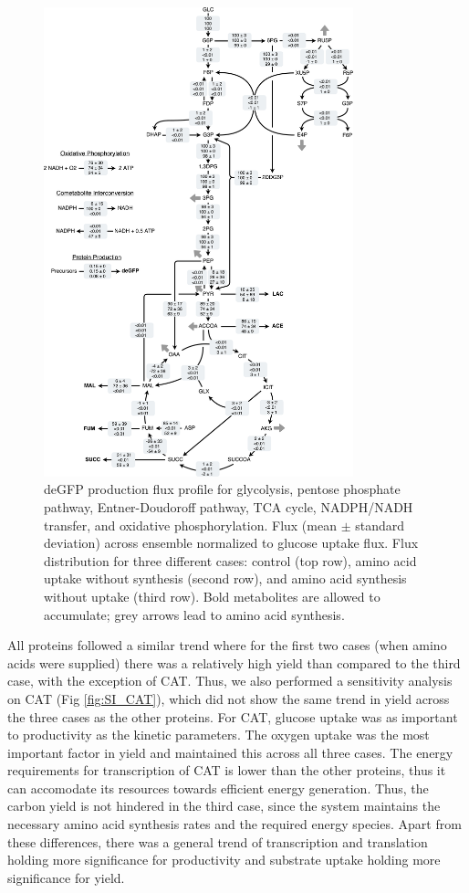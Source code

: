 \documentclass[journal=asbcd6,manuscript=article]{achemso}
\begin{document}
\begin{figure}[h!]
\includegraphics[width=0.8\textwidth]{./Figures/flux.pdf}
\caption{deGFP production flux profile for glycolysis, pentose phosphate pathway, Entner-Doudoroff pathway, TCA cycle, NADPH/NADH transfer, and oxidative phosphorylation. Flux (mean $\pm$ standard deviation) across ensemble normalized to glucose uptake flux. Flux distribution for three different cases: control (top row), amino acid uptake without synthesis (second row), and amino acid synthesis without uptake (third row). Bold metabolites are allowed to accumulate; grey arrows lead to amino acid synthesis.}
\label{fig:flux}
\end{figure}

All proteins followed a similar trend where for the first two cases (when amino acids were supplied) there was a relatively high yield than compared to the third case, with the exception of CAT. 
Thus, we also performed a sensitivity analysis on CAT (Fig \ref{fig:SI_CAT}), which did not show the same trend in yield across the three cases as the other proteins.
For CAT, glucose uptake was as important to productivity as the kinetic parameters.
The oxygen uptake was the most important factor in yield and maintained this across all three cases.
The energy requirements for transcription of CAT is lower than the other proteins, thus it can accomodate its resources towards efficient energy generation.
Thus, the carbon yield is not hindered in the third case, since the system maintains the necessary amino acid synthesis rates and the required energy species.
Apart from these differences, there was a general trend of transcription and translation holding more significance for productivity and substrate uptake holding more significance for yield.
\end{document}
